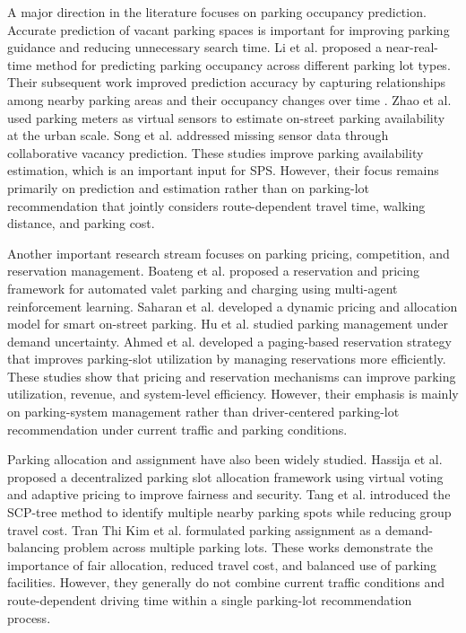 A major direction in the literature focuses on parking occupancy prediction. Accurate prediction of vacant parking spaces is important for improving parking guidance and reducing unnecessary search time. Li et al. \cite{ref1} proposed a near-real-time method for predicting parking occupancy across different parking lot types. Their subsequent work improved prediction accuracy by capturing relationships among nearby parking areas and their occupancy changes over time \cite{ref2}. Zhao et al. \cite{ref3} used parking meters as virtual sensors to estimate on-street parking availability at the urban scale. Song et al. \cite{ref4} addressed missing sensor data through collaborative vacancy prediction. These studies improve parking availability estimation, which is an important input for SPS. However, their focus remains primarily on prediction and estimation rather than on parking-lot recommendation that jointly considers route-dependent travel time, walking distance, and parking cost.

Another important research stream focuses on parking pricing, competition, and reservation management. Boateng et al. \cite{ref5} proposed a reservation and pricing framework for automated valet parking and charging using multi-agent reinforcement learning. Saharan et al. \cite{ref6} developed a dynamic pricing and allocation model for smart on-street parking. Hu et al. \cite{ref7} studied parking management under demand uncertainty. Ahmed et al. \cite{ref8} developed a paging-based reservation strategy that improves parking-slot utilization by managing reservations more efficiently. These studies show that pricing and reservation mechanisms can improve parking utilization, revenue, and system-level efficiency. However, their emphasis is mainly on parking-system management rather than driver-centered parking-lot recommendation under current traffic and parking conditions.

Parking allocation and assignment have also been widely studied. Hassija et al. \cite{ref9} proposed a decentralized parking slot allocation framework using virtual voting and adaptive pricing to improve fairness and security. Tang et al. \cite{ref10} introduced the SCP-tree method to identify multiple nearby parking spots while reducing group travel cost. Tran Thi Kim et al. \cite{ref11} formulated parking assignment as a demand-balancing problem across multiple parking lots. These works demonstrate the importance of fair allocation, reduced travel cost, and balanced use of parking facilities. However, they generally do not combine current traffic conditions and route-dependent driving time within a single parking-lot recommendation process.


